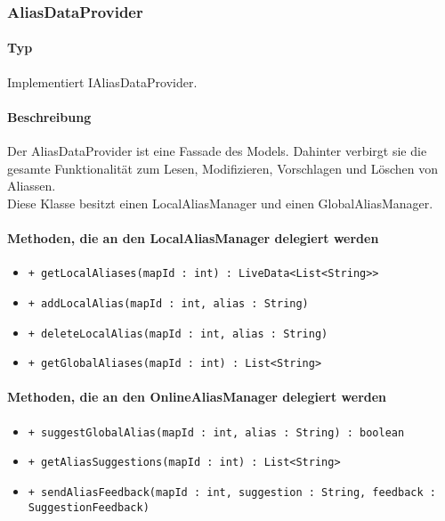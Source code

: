 \subsubsection{AliasDataProvider}
\paragraph*{Typ}
Implementiert IAliasDataProvider.
\paragraph*{Beschreibung}
Der AliasDataProvider ist eine Fassade des Models. 
Dahinter verbirgt sie die gesamte Funktionalität zum Lesen, Modifizieren, Vorschlagen und Löschen von Aliassen.\\
Diese Klasse besitzt einen LocalAliasManager und einen GlobalAliasManager.

\paragraph*{Methoden, die an den LocalAliasManager delegiert werden}
\begin{itemize}
    \item \texttt{+ getLocalAliases(mapId : int) : LiveData<List<String>>}
    \item \texttt{+ addLocalAlias(mapId : int, alias : String)}
    \item \texttt{+ deleteLocalAlias(mapId : int, alias : String)}
    \item \texttt{+ getGlobalAliases(mapId : int) : List<String>}%
\end{itemize}

\paragraph*{Methoden, die an den OnlineAliasManager delegiert werden}
\begin{itemize}
    \item \texttt{+ suggestGlobalAlias(mapId : int, alias : String) : boolean}
    \item \texttt{+ getAliasSuggestions(mapId : int) : List<String>}
    \item \texttt{+ sendAliasFeedback(mapId : int, suggestion : String, feedback : SuggestionFeedback)}
\end{itemize}

